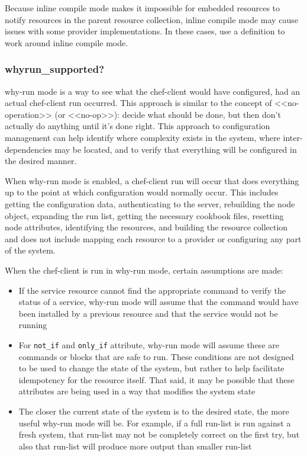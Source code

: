 Because inline compile mode makes it impossible for embedded resources to notify resources in the parent resource collection, inline compile mode may cause issues with some provider implementations. In these cases, use a definition to work around inline compile mode.

\subsubsection{whyrun\_supported?}

why-run mode is a way to see what the chef-client would have configured, had an actual chef-client run occurred. This approach is similar to the concept of <<no-operation>> (or <<no-op>>): decide what should be done, but then don't actually do anything until it's done right. This approach to configuration management can help identify where complexity exists in the system, where inter-dependencies may be located, and to verify that everything will be configured in the desired manner.

When why-run mode is enabled, a chef-client run will occur that does everything up to the point at which configuration would normally occur. This includes getting the configuration data, authenticating to the server, rebuilding the node object, expanding the run list, getting the necessary cookbook files, resetting node attributes, identifying the resources, and building the resource collection and does not include mapping each resource to a provider or configuring any part of the system.

When the chef-client is run in why-run mode, certain assumptions are made:

\begin{itemize}
  \item If the service resource cannot find the appropriate command to verify the status of a service, why-run mode will assume that the command would have been installed by a previous resource and that the service would not be running
  \item For \lstinline!not_if! and \lstinline!only_if! attribute, why-run mode will assume these are commands or blocks that are safe to run. These conditions are not designed to be used to change the state of the system, but rather to help facilitate idempotency for the resource itself. That said, it may be possible that these attributes are being used in a way that modifies the system state
  \item The closer the current state of the system is to the desired state, the more useful why-run mode will be. For example, if a full run-list is run against a fresh system, that run-list may not be completely correct on the first try, but also that run-list will produce more output than smaller run-list
\end{itemize}

